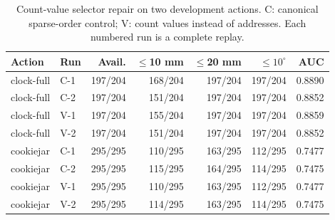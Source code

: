 \begin{table}[t]\centering\scriptsize
\caption{Count-value selector repair on two development actions. C: canonical sparse-order control; V: count values instead of addresses. Each numbered run is a complete replay.}
\label{tab:bt-count-values}
\begin{tabular}{llrrrrr}\toprule
Action & Run & Avail. & $\leq$10 mm & $\leq$20 mm & $\leq10^\circ$ & AUC\\\midrule
clock-full & C-1 & 197/204 & 168/204 & 197/204 & 197/204 & 0.8890\\
clock-full & C-2 & 197/204 & 151/204 & 197/204 & 197/204 & 0.8852\\
clock-full & V-1 & 197/204 & 155/204 & 197/204 & 197/204 & 0.8859\\
clock-full & V-2 & 197/204 & 151/204 & 197/204 & 197/204 & 0.8852\\
cookiejar & C-1 & 295/295 & 110/295 & 163/295 & 112/295 & 0.7477\\
cookiejar & C-2 & 295/295 & 115/295 & 164/295 & 114/295 & 0.7475\\
cookiejar & V-1 & 295/295 & 110/295 & 163/295 & 112/295 & 0.7477\\
cookiejar & V-2 & 295/295 & 114/295 & 163/295 & 114/295 & 0.7475\\
\bottomrule\end{tabular}\end{table}
